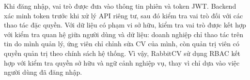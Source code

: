Khi đăng nhập, vai trò được đưa vào thông tin phiên và token JWT. Backend xác minh token trước khi xử lý API riêng tư, sau đó kiểm tra vai trò đối với các thao tác đặc quyền. Với dữ liệu có phạm vi sở hữu, kiểm tra vai trò được kết hợp với kiểm tra quan hệ giữa người dùng và dữ liệu: doanh nghiệp chỉ thao tác trên tin do mình quản lý, ứng viên chỉ chỉnh sửa CV của mình, còn quản trị viên có quyền quản trị theo chính sách hệ thống. Vì vậy, RabbitCV sử dụng RBAC kết hợp với kiểm tra quyền sở hữu và ngữ cảnh nghiệp vụ, thay vì chỉ dựa vào việc người dùng đã đăng nhập.



